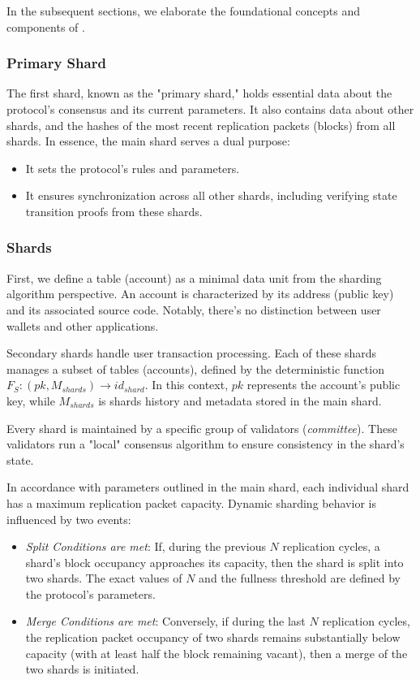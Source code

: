 In the subsequent sections, we elaborate the foundational concepts and components of \protocol.

\subsubsection{Primary Shard}

The first shard, known as the "primary shard," holds essential data about 
the protocol's consensus and its current parameters. It also contains 
data about other shards, 
and the hashes of the most recent replication packets (blocks) 
from all shards. In essence, the main shard serves a dual purpose:
\begin{itemize}
    \item It sets the protocol's rules and parameters.
    \item It ensures synchronization across all other shards,
        including verifying state transition proofs from these shards.
\end{itemize}

\subsubsection{Shards}
First, we define a table (account) as a minimal data unit from the sharding 
algorithm perspective. An account is characterized by its address (public key) 
and its associated source code. Notably, there's no distinction between user 
wallets and other applications. 

Secondary shards handle user transaction processing. Each of these shards manages 
a subset of tables (accounts), defined by the deterministic function 
$F_S: (pk, M_{shards}) \to id_{shard}$.
In this context, $pk$ represents the account's public key, 
while $M_{shards}$ is shards history and metadata stored in the main shard. 

Every shard is maintained by a specific group of validators (\textit{committee}). 
These validators run a "local" consensus algorithm to ensure consistency in the 
shard's state. 

In accordance with parameters outlined in the main shard, each individual shard 
has a maximum replication packet capacity. Dynamic sharding behavior is influenced 
by two events:
\begin{itemize}
    \item \textit{Split Conditions are met}: 
        If, during the previous $N$ replication cycles, a shard's block occupancy 
        approaches its capacity, then the shard is split into two shards. 
        The exact values of $N$ and the fullness threshold 
        are defined by the protocol's parameters.
    \item \textit{Merge Conditions are met}: 
        Conversely, if during the last $N$ replication cycles, the replication
        packet occupancy of two shards remains substantially below capacity 
        (with at least half the block remaining vacant), then a merge of the 
        two shards is initiated.
\end{itemize}

